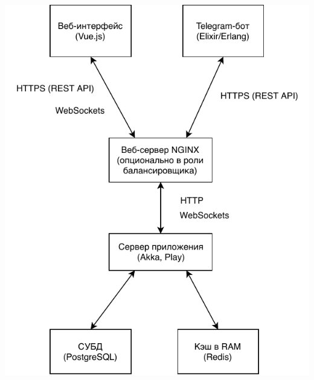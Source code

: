 \documentclass[12pt, a4paper]{article}
\begin{document}
\begin{center}
\includegraphics{architecture-overview.pdf}
\end{center}
\end{document}
